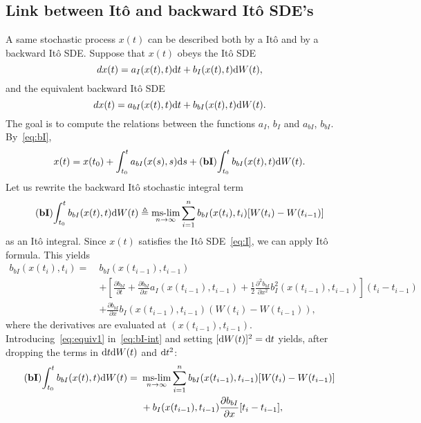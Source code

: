 \subsection{Link between Itô and backward Itô SDE's}
A same stochastic process $x(t)$ can be described both by a Itô and by a backward Itô SDE. Suppose that $x(t)$ obeys the Itô SDE
\begin{equation} \label{eq:I}
	dx(t) = a_I(x(t),t) \rm dt + b_I(x(t),t) \rm dW(t),
\end{equation}
and the equivalent backward Itô SDE
\begin{equation} \label{eq:bI}
	dx(t) = a_{bI}(x(t),t) \rm dt + b_{bI}(x(t),t) \rm dW(t). 
\end{equation}
The goal is to compute the relations between the functions $a_I$, $b_I$ and $a_{bI}$, $b_{bI}$. By~\eqref{eq:bI},
\begin{equation}
	x(t) = x(t_0) + \int_{t_0}^t a_{bI}(x(s),s) \rm ds + \bI \int_{t_0}^t b_{bI}(x(t),t) \rm dW(t).
\end{equation}
Let us rewrite the backward Itô stochastic integral term
\begin{equation} \label{eq:bI-int}
	\bI \int_{t_0}^t b_{bI}(x(t),t) \rm dW(t) \triangleq \mslim_{n\rightarrow \infty} \sum_{i=1}^n b_{bI}(x(t_{i}),t_{i}) [W(t_i)-W(t_{i-1})]
\end{equation}
as an Itô integral. Since $x(t)$ satisfies the Itô SDE~\eqref{eq:I}, we can apply Itô formula. This yields 
\begin{align} \label{eq:equiv1}
	b_{bI}(x(t_i),t_{i}) =~& b_{bI}(x(t_{i-1}),t_{i-1}) \nonumber\\
		&+ \left[\frac{\partial b_{bI}}{\partial t} + \frac{\partial b_{bI}}{\partial x} a_I(x(t_{i-1}),t_{i-1}) + \frac{1}{2}\frac{\partial^2 b_{bI}}{\partial x^2} b_I^2(x(t_{i-1}),t_{i-1})\right] (t_i - t_{i-1}) \nonumber\\
		&+ \frac{\partial b_{bI}}{\partial x}b_I(x(t_{i-1}),t_{i-1}) (W(t_i) - W(t_{i-1})),
\end{align}
where the derivatives are evaluated at $(x(t_{i-1}),t_{i-1})$. Introducing~\eqref{eq:equiv1} in~\eqref{eq:bI-int} and setting $[\rm dW(t)]^2 = \rm dt$ yields, after dropping the terms in $\rm dt \rm dW(t)$ and $\rm dt^2$:
\begin{align}
	\bI \int_{t_0}^t b_{bI}(x(t),t) \rm dW(t) =~& \mslim_{n\rightarrow \infty} \sum_{i=1}^n b_{bI}(x(t_{i-1}),t_{i-1}) [W(t_i)-W(t_{i-1})] \nonumber\\
	&+ b_I(x(t_{i-1}),t_{i-1}) \frac{\partial b_{bI}}{\partial x}[t_i - t_{i-1}],
\end{align}
